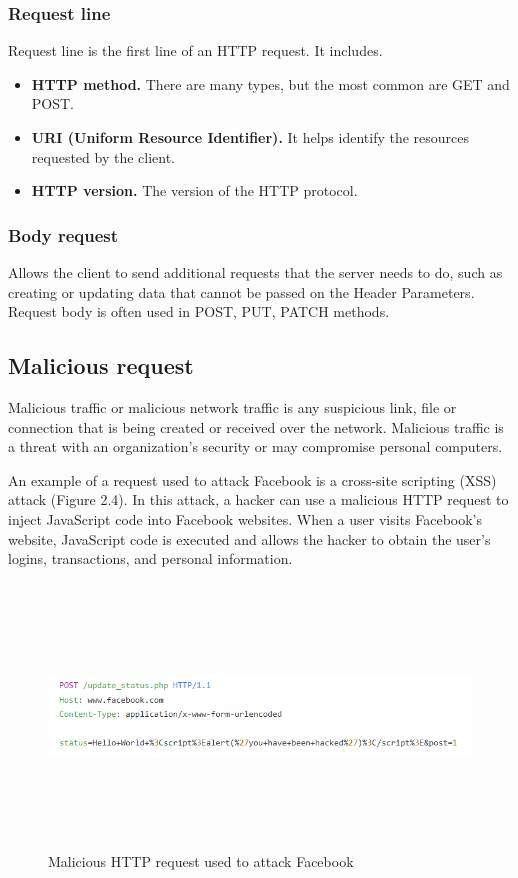 \subsubsection{Request line}
\hspace{0.5cm}Request line is the first line of an HTTP request. It includes.
\begin{itemize}
	\item \textbf{HTTP method.} There are many types, but the most common are GET and POST.
	\item \textbf{URI (Uniform Resource Identifier).} It helps identify the resources requested by the client.
	\item \textbf{HTTP version.} The version of the HTTP protocol.
\end{itemize}
\subsubsection{Body request}
\hspace{0.5cm}Allows the client to send additional requests that the server needs to do, such as creating or updating data that cannot be passed on the Header Parameters. Request body is often used in POST, PUT, PATCH methods.
\subsection{Malicious request}
\hspace{0.5cm}Malicious traffic or malicious network traffic is any suspicious link, file or connection that is being created or received over the network. Malicious traffic is a threat with an organization's security or may compromise personal computers.

An example of a request used to attack Facebook is a cross-site scripting (XSS) attack (Figure 2.4). In this attack, a hacker can use a malicious HTTP request to inject JavaScript code into Facebook websites. When a user visits Facebook's website, JavaScript code is executed and allows the hacker to obtain the user's logins, transactions, and personal information.

\begin{figure}[h!]
	\centering
	\includegraphics[width=\linewidth, height=7cm,keepaspectratio]{figures/malicious request.png}
	\caption{Malicious HTTP request used to attack Facebook}
\end{figure}

